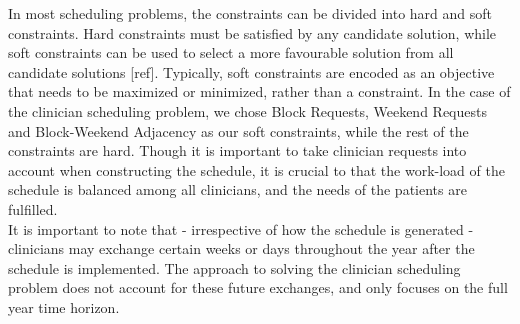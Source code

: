 In most scheduling problems, the constraints can be divided into hard and soft constraints. Hard constraints must be satisfied by any candidate solution, while soft constraints can be used to select a more favourable solution from all candidate solutions [ref]. Typically, soft constraints are encoded as an objective that needs to be maximized or minimized, rather than a constraint. In the case of the clinician scheduling problem, we chose Block Requests, Weekend Requests and Block-Weekend Adjacency as our soft constraints, while the rest of the constraints are hard. Though it is important to take clinician requests into account when constructing the schedule, it is crucial to that the work-load of the schedule is balanced among all clinicians, and the needs of the patients are fulfilled. \\

It is important to note that - irrespective of how the schedule is generated - clinicians may exchange certain weeks or days throughout the year after the schedule is implemented. The approach to solving the clinician scheduling problem does not account for these future exchanges, and only focuses on the full year time horizon.